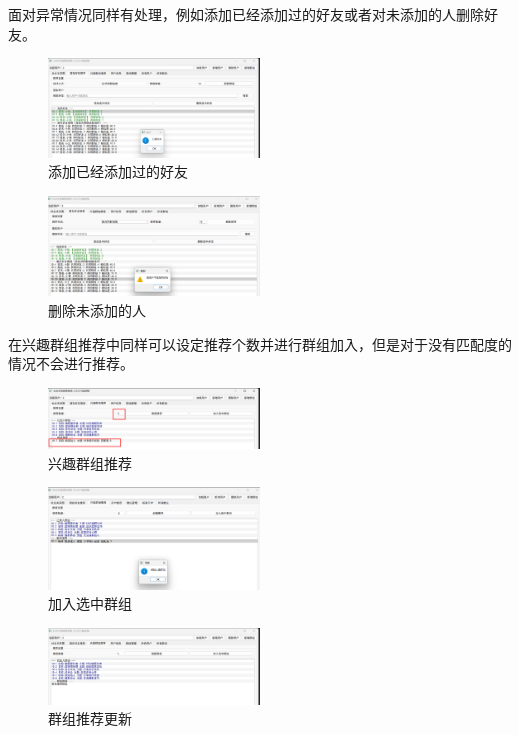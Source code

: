 \documentclass[12pt,a4paper]{article}
\begin{document}
面对异常情况同样有处理，例如添加已经添加过的好友或者对未添加的人删除好友。

\begin{figure}[H]
    \centering
    \includegraphics[width=0.5\textwidth]{pt2-21.png}
    \caption{添加已经添加过的好友}
\end{figure}

\begin{figure}[H]
    \centering
    \includegraphics[width=0.5\textwidth]{pt2-22.png}
    \caption{删除未添加的人}
\end{figure}

在兴趣群组推荐中同样可以设定推荐个数并进行群组加入，但是对于没有匹配度的情况不会进行推荐。

\begin{figure}[H]
    \centering
    \includegraphics[width=0.5\textwidth]{pt2-24.png}
    \caption{兴趣群组推荐}
\end{figure}

\begin{figure}[H]
    \centering
    \includegraphics[width=0.5\textwidth]{pt2-25.png}
    \caption{加入选中群组}
\end{figure}

\begin{figure}[H]
    \centering
    \includegraphics[width=0.5\textwidth]{pt2-26.png}
    \caption{群组推荐更新}
\end{figure}
\end{document}
